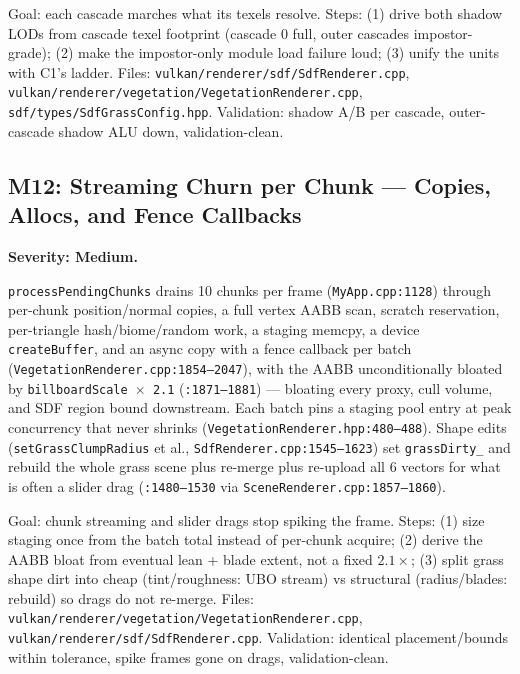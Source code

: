 \documentclass[11pt,a4paper]{article}
\begin{document}
\begin{tcolorbox}[promptbox={Prompt --- M11: footprint-driven shadow LOD}]
Goal: each cascade marches what its texels resolve. Steps: (1) drive both
shadow LODs from cascade texel footprint (cascade 0 full, outer cascades
impostor-grade); (2) make the impostor-only module load failure loud;
(3) unify the units with C1's ladder. Files:
\texttt{vulkan/renderer/sdf/SdfRenderer.cpp},
\texttt{vulkan/renderer/vegetation/VegetationRenderer.cpp},
\texttt{sdf/types/SdfGrassConfig.hpp}. Validation: shadow A/B per cascade,
outer-cascade shadow ALU down, validation-clean.
\end{tcolorbox}

\subsection{M12: Streaming Churn per Chunk --- Copies, Allocs, and Fence Callbacks}

\textbf{Severity: Medium.}

\texttt{processPendingChunks} drains 10 chunks per frame
(\texttt{MyApp.cpp:1128}) through per-chunk position/normal copies, a full
vertex AABB scan, scratch reservation, per-triangle hash/biome/random work,
a staging memcpy, a device \texttt{createBuffer}, and an async copy with a
fence callback per batch (\texttt{VegetationRenderer.cpp:1854--2047}),
with the AABB unconditionally bloated by \texttt{billboardScale $\times$
2.1} (\texttt{:1871--1881}) --- bloating every proxy, cull volume, and SDF
region bound downstream. Each batch pins a staging pool entry at peak
concurrency that never shrinks (\texttt{VegetationRenderer.hpp:480--488}).
Shape edits (\texttt{setGrassClumpRadius} et al.,
\texttt{SdfRenderer.cpp:1545--1623}) set \texttt{grassDirty\_} and rebuild
the whole grass scene plus re-merge plus re-upload all 6 vectors for what is
often a slider drag (\texttt{:1480--1530} via
\texttt{SceneRenderer.cpp:1857--1860}).

\begin{tcolorbox}[promptbox={Prompt --- M12: quieter streaming, coarser grass dirty}]
Goal: chunk streaming and slider drags stop spiking the frame. Steps:
(1) size staging once from the batch total instead of per-chunk acquire;
(2) derive the AABB bloat from eventual lean + blade extent, not a fixed
$2.1\times$; (3) split grass shape dirt into cheap (tint/roughness: UBO
stream) vs structural (radius/blades: rebuild) so drags do not re-merge.
Files: \texttt{vulkan/renderer/vegetation/VegetationRenderer.cpp},
\texttt{vulkan/renderer/sdf/SdfRenderer.cpp}. Validation: identical
placement/bounds within tolerance, spike frames gone on drags,
validation-clean.
\end{tcolorbox}
\end{document}

